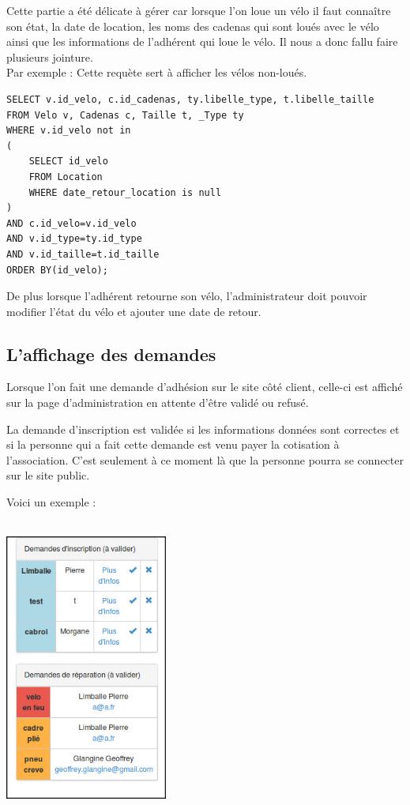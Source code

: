 \documentclass[11pt,a4paper,titlepage]{report}
\begin{document}
Cette partie a été délicate à gérer car lorsque l'on loue un vélo il faut connaître son état, la date de location, les noms des cadenas qui sont loués avec le vélo ainsi que les informations de l'adhérent qui loue le vélo. Il nous a donc fallu faire plusieurs jointure.\\

Par exemple : Cette requète sert à afficher les vélos non-loués. 
\begin{verbatim}
SELECT v.id_velo, c.id_cadenas, ty.libelle_type, t.libelle_taille
FROM Velo v, Cadenas c, Taille t, _Type ty 
WHERE v.id_velo not in
(
    SELECT id_velo 
    FROM Location 
    WHERE date_retour_location is null
)
AND c.id_velo=v.id_velo
AND v.id_type=ty.id_type
AND v.id_taille=t.id_taille
ORDER BY(id_velo);
\end{verbatim} 

De plus lorsque l'adhérent retourne son vélo, l'administrateur doit pouvoir modifier l'état du vélo et ajouter une date de retour. 

\subsection{L'affichage des demandes}
Lorsque l'on fait une demande d'adhésion sur le site côté client, celle-ci est affiché sur la page d'administration en attente d'être validé ou refusé.

La demande d'inscription est validée si les informations données sont correctes et si la personne qui a fait cette demande est venu payer la cotisation à l'association. C'est seulement à ce moment là que la personne pourra se connecter sur le site public.

Voici un exemple :\\\\
\begin{center}
\includegraphics[width=0.4\textwidth]{demande.jpg}~
\end{center}
\pagebreak
\end{document}
